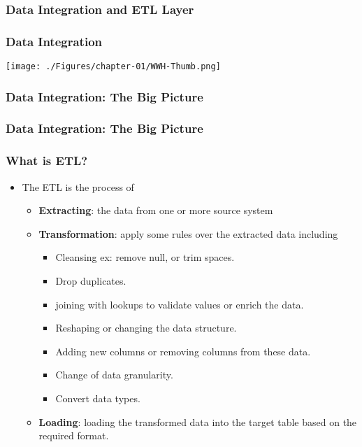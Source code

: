 \subsubsection{Data Integration and ETL Layer}

\begin{frame}
	\frametitle{Data Integration}

	\texttt{[image: ./Figures/chapter-01/WWH-Thumb.png]}

\end{frame}
\begin{frame}
	\frametitle{Data Integration: The Big Picture}

	

\end{frame}
\begin{frame}
	\frametitle{Data Integration: The Big Picture}

	

\end{frame}
\begin{frame}
	\frametitle{What is ETL?}

	\begin{itemize}[<+->]
		\item The ETL is the process of
		\begin{itemize}[<+->]
			\item  \textbf{Extracting}: the data from one or more source system
			\item  \textbf{Transformation}: apply some rules over the extracted data including
			\begin{itemize}[<+->]
				\item Cleansing ex: remove null, or trim spaces.
				\item Drop duplicates.
				\item joining with lookups to validate values or enrich the data.
				\item Reshaping or changing the data structure.
				\item Adding new columns or removing columns from these data.
				\item Change of data granularity.
				\item Convert data types.
			\end{itemize}
			\item \textbf{Loading}: loading the transformed data into the target table based on the required format.
		\end{itemize}
	\end{itemize}

\end{frame}
